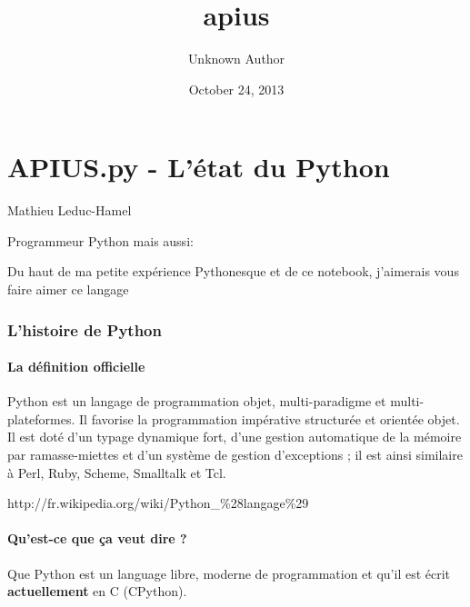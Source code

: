 \documentclass[letterpaper,10pt,english]{/Users/mlhamel/venv/apius/lib/python2.7/site-packages/sphinx/texinputs/sphinxhowto}
\title{apius}
\date{October 24, 2013}
\author{Unknown Author}
\begin{document}
        
            \maketitle
        

        


        
        \part{APIUS.py - L'état du Python }Mathieu Leduc-Hamel

Programmeur Python mais aussi:

 Du haut de ma petite expérience Pythonesque et de ce notebook,
j'aimerais vous faire aimer ce langage\section{L'histoire de Python}\subsection{La définition officielle}\label{la-définition-officielle}

Python est un langage de programmation objet, multi-paradigme et
multi-plateformes. Il favorise la programmation impérative structurée et
orientée objet. Il est doté d'un typage dynamique fort, d'une gestion
automatique de la mémoire par ramasse-miettes et d'un système de gestion
d'exceptions ; il est ainsi similaire à Perl, Ruby, Scheme, Smalltalk et
Tcl.

http://fr.wikipedia.org/wiki/Python\_\%28langage\%29\subsection{Qu'est-ce que ça veut dire
?}\label{quest-ce-que-ça-veut-dire}

Que Python est un language libre, moderne de programmation et qu'il est
écrit \textbf{actuellement} en C (CPython).

\end{document}
